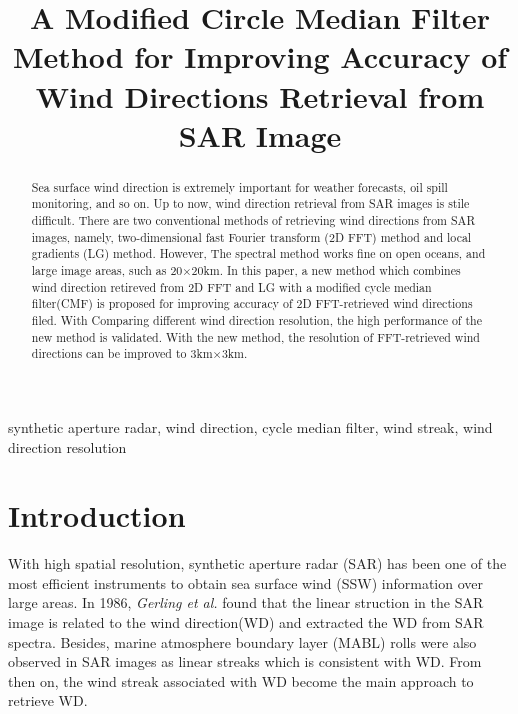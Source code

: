 \documentclass{article}
\title{A Modified Circle Median Filter Method for Improving Accuracy of Wind Directions Retrieval from SAR Image}
\begin{document}
%
\maketitle
%
\begin{abstract}
Sea surface wind direction is extremely important for weather forecasts, oil spill monitoring, and so on. Up to now, wind direction retrieval from SAR images is stile difficult. There are two conventional methods of retrieving wind directions from SAR images, namely, two-dimensional fast Fourier transform (2D FFT) method and local gradients (LG) method. However, The spectral method works fine on open oceans, and large image areas, such as 20$\times$20km. In this paper, a new method which combines wind direction retireved from 2D FFT and LG with a modified cycle median filter(CMF) is proposed for improving accuracy of 2D FFT-retrieved wind directions filed. With Comparing different wind direction resolution, the high performance of the new method is validated. With the new method, the resolution of FFT-retrieved wind directions can be improved to 3km$\times$3km.
\end{abstract}
\begin{keywords}
synthetic aperture radar, wind direction, cycle median filter, wind streak, wind direction resolution
\end{keywords}
%
\section{Introduction}
\label{sec:intro}

With high spatial resolution, synthetic aperture radar (SAR) has been one of the most efficient instruments to obtain sea surface wind (SSW) information over large areas. In 1986, {\it Gerling et al.}\cite{Gerling:1986ee} found that the linear struction in the SAR image is related to the wind direction(WD) and extracted the WD from SAR spectra. Besides, marine atmosphere boundary layer (MABL) rolls were also observed in SAR images as linear streaks which is consistent with WD\cite{Alpers:1994hy}. From then on, the wind streak associated with WD become the main approach to retrieve WD. 
\end{document}
